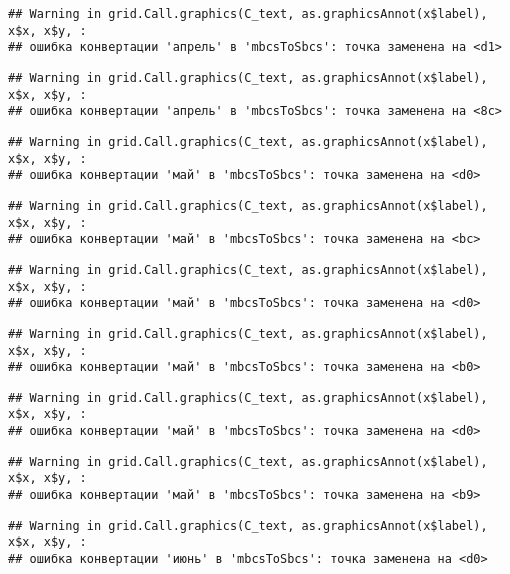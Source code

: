 \documentclass[
]{article}
\begin{document}
\begin{verbatim}
## Warning in grid.Call.graphics(C_text, as.graphicsAnnot(x$label), x$x, x$y, :
## ошибка конвертации 'апрель' в 'mbcsToSbcs': точка заменена на <d1>
\end{verbatim}

\begin{verbatim}
## Warning in grid.Call.graphics(C_text, as.graphicsAnnot(x$label), x$x, x$y, :
## ошибка конвертации 'апрель' в 'mbcsToSbcs': точка заменена на <8c>
\end{verbatim}

\begin{verbatim}
## Warning in grid.Call.graphics(C_text, as.graphicsAnnot(x$label), x$x, x$y, :
## ошибка конвертации 'май' в 'mbcsToSbcs': точка заменена на <d0>
\end{verbatim}

\begin{verbatim}
## Warning in grid.Call.graphics(C_text, as.graphicsAnnot(x$label), x$x, x$y, :
## ошибка конвертации 'май' в 'mbcsToSbcs': точка заменена на <bc>
\end{verbatim}

\begin{verbatim}
## Warning in grid.Call.graphics(C_text, as.graphicsAnnot(x$label), x$x, x$y, :
## ошибка конвертации 'май' в 'mbcsToSbcs': точка заменена на <d0>
\end{verbatim}

\begin{verbatim}
## Warning in grid.Call.graphics(C_text, as.graphicsAnnot(x$label), x$x, x$y, :
## ошибка конвертации 'май' в 'mbcsToSbcs': точка заменена на <b0>
\end{verbatim}

\begin{verbatim}
## Warning in grid.Call.graphics(C_text, as.graphicsAnnot(x$label), x$x, x$y, :
## ошибка конвертации 'май' в 'mbcsToSbcs': точка заменена на <d0>
\end{verbatim}

\begin{verbatim}
## Warning in grid.Call.graphics(C_text, as.graphicsAnnot(x$label), x$x, x$y, :
## ошибка конвертации 'май' в 'mbcsToSbcs': точка заменена на <b9>
\end{verbatim}

\begin{verbatim}
## Warning in grid.Call.graphics(C_text, as.graphicsAnnot(x$label), x$x, x$y, :
## ошибка конвертации 'июнь' в 'mbcsToSbcs': точка заменена на <d0>
\end{verbatim}
\end{document}
